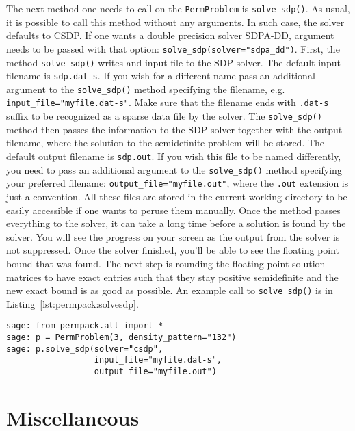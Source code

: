 \documentclass[12pt, a4paper, twoside]{report}
\begin{document}
The next method one needs to call on the \texttt{PermProblem} is \texttt{solve\_sdp()}. As usual, it is possible to call this method without any arguments. In such case, the solver defaults to CSDP. If one wants a double precision solver SDPA-DD, argument needs to be passed with that option: \texttt{solve\_sdp(solver="sdpa\_dd")}. First, the method \texttt{solve\_sdp()} writes and input file to the SDP solver. The default input filename is \texttt{sdp.dat-s}. If you wish for a different name pass an additional argument to the \texttt{solve\_sdp()} method specifying the filename, e.g. \texttt{input\_file="myfile.dat-s"}. Make sure that the filename ends with \texttt{.dat-s} suffix to be recognized as a sparse data file by the solver. The \texttt{solve\_sdp()} method then passes the information to the SDP solver together with the output filename, where the solution to the semidefinite problem will be stored. The default output filename is \texttt{sdp.out}. If you wish this file to be named differently, you need to pass an additional argument to the \texttt{solve\_sdp()} method specifying your preferred filename: \texttt{output\_file="myfile.out"}, where the \texttt{.out} extension is just a convention. All these files are stored in the current working directory to be easily accessible if one wants to peruse them manually. Once the method passes everything to the solver, it can take a long time before a solution is found by the solver. You will see the progress on your screen as the output from the solver is not suppressed. Once the solver finished, you'll be able to see the floating point bound that was found. The next step is rounding the floating point solution matrices to have exact entries such that they stay positive semidefinite and the new exact bound is as good as possible. An example call to \texttt{solve\_sdp()} is in Listing~\ref{lst:permpack:solvesdp}.

 {}
\begin{lstlisting}
sage: from permpack.all import *
sage: p = PermProblem(3, density_pattern="132")
sage: p.solve_sdp(solver="csdp",
                  input_file="myfile.dat-s",
                  output_file="myfile.out")
\end{lstlisting}



\section{Miscellaneous}
\label{sec:permpack-misc}




{}

 
\end{document}
